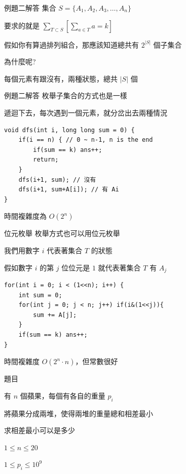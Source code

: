 \begin{frame}{例題二解答}
    集合 $S = \{A_1, A_2, A_3, \ldots, A_n\}$

    要求的就是 $\sum_{T \subset S} [\sum_{a \in T} a = k]$\pause

    假如你有算過排列組合，那應該知道總共有 $2^{\lvert S \rvert}$ 個子集合

    為什麼呢?\pause

    每個元素有跟沒有，兩種狀態，總共 $\lvert S \rvert$ 個
\end{frame}

\begin{frame}[fragile]{例題二解答}
    枚舉子集合的方式也是一樣

    遞迴下去，每次遇到一個元素，就分岔出去兩種情況

\begin{lstlisting}
void dfs(int i, long long sum = 0) {
    if(i == n) { // 0 ~ n-1, n is the end
        if(sum == k) ans++;
        return;
    }
    dfs(i+1, sum); // 沒有
    dfs(i+1, sum+A[i]); // 有 Ai
}
\end{lstlisting}

時間複雜度為 $O(2^n)$
\end{frame}

\begin{frame}[fragile]{位元枚舉}
    枚舉方式也可以用位元枚舉

    我們用數字 $i$ 代表著集合 $T$ 的狀態

    假如數字 $i$ 的第 $j$ 位位元是 $1$ 就代表著集合 $T$ 有 $A_j$

\begin{lstlisting}
for(int i = 0; i < (1<<n); i++) {
    int sum = 0;
    for(int j = 0; j < n; j++) if(i&(1<<j)){
        sum += A[j];
    }
    if(sum == k) ans++;
}
\end{lstlisting}

時間複雜度 $O(2^n \cdot n)$，但常數很好
\end{frame}

\begin{frame}{題目}
    \begin{exercise}
        有 $n$ 個蘋果，每個有各自的重量 $p_i$

        將蘋果分成兩堆，使得兩堆的重量總和相差最小

        求相差最小可以是多少

        $1 \le n \le 20$

        $1 \le p_i \le 10^9$
    \end{exercise}
\end{frame}

